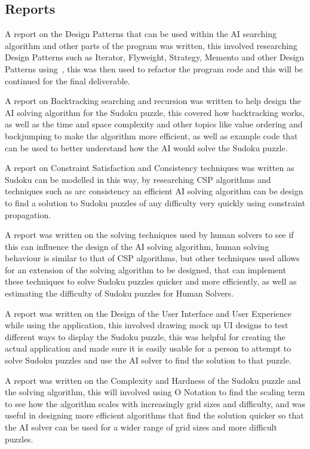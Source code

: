 \documentclass[]{final_report}
\begin{document}
\subsection*{Reports}

A report on the Design Patterns that can be used within the AI searching algorithm and other parts of the program was written, this involved researching Design Patterns such as Iterator, Flyweight, Strategy, Memento and other Design Patterns using~\cite{GAMMA:1995}, this was then used to refactor the program code and this will be continued for the final deliverable.

A report on Backtracking searching and recursion was written to help design the AI solving algorithm for the Sudoku puzzle, this covered how backtracking works, as well as the time and space complexity and other topics like value ordering and backjumping to make the algorithm more efficient, as well as example code that can be used to better understand how the AI would solve the Sudoku puzzle.

A report on Constraint Satisfaction and Consistency techniques was written as Sudoku can be modelled in this way, by researching CSP algorithms and techniques such as arc consistency an efficient AI solving algorithm can be design to find a solution to Sudoku puzzles of any difficulty very quickly using constraint propagation.

A report was written on the solving techniques used by human solvers to see if this can influence the design of the AI solving algorithm, human solving behaviour is similar to that of CSP algorithms, but other techniques used allows for an extension of the solving algorithm to be designed, that can implement these techniques to solve Sudoku puzzles quicker and more efficiently, as well as estimating the difficulty of Sudoku puzzles for Human Solvers.

A report was written on the Design of the User Interface and User Experience while using the application, this involved drawing mock up UI designs to test different ways to display the Sudoku puzzle, this was helpful for creating the actual application and made sure it is easily usable for a person to attempt to solve Sudoku puzzles and use the AI solver to find the solution to that puzzle.

A report was written on the Complexity and Hardness of the Sudoku puzzle and the solving algorithm, this will involved using O Notation to find the scaling term to see how the algorithm scales with increasingly grid sizes and difficulty, and was useful in designing more efficient algorithms that find the solution quicker so that the AI solver can be used for a wider range of grid sizes and more difficult puzzles.
\end{document}
